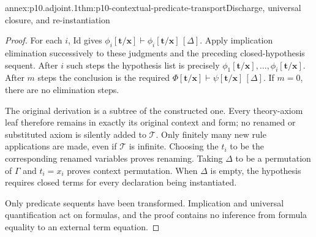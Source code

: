 \begin{annexitem}{annex:p10.adjoint.1}{thm:p10-contextual-predicate-transport}{Discharge, universal closure, and re-instantiation}
\begin{proof}
For each \(i\), Id gives
\(\phi_i[\mathbf t/\mathbf x]\vdash
  \phi_i[\mathbf t/\mathbf x]\,[\Delta]\).
Apply implication elimination successively to these judgments
and the preceding closed-hypothesis sequent. After \(i\) such
steps the hypothesis list is precisely
\(\phi_1[\mathbf t/\mathbf x],\ldots,
  \phi_i[\mathbf t/\mathbf x]\).
After \(m\) steps the conclusion is the required
\(\Phi[\mathbf t/\mathbf x]\vdash
  \psi[\mathbf t/\mathbf x]\,[\Delta]\).
If \(m=0\), there are no elimination steps.

The original derivation is a subtree of the constructed one.
Every theory-axiom leaf therefore remains in exactly its original
context and form; no renamed or substituted axiom is silently
added to \(\mathcal T\). Only finitely many new rule applications
are made, even if \(\mathcal T\) is infinite.
Choosing the \(t_i\) to be the corresponding renamed variables
proves renaming. Taking \(\Delta\) to be a permutation of
\(\Gamma\) and \(t_i=x_i\) proves context permutation.
When \(\Delta\) is empty, the hypothesis requires
closed terms for every declaration being instantiated.

Only predicate sequents have been transformed. Implication and
universal quantification act on formulas, and the proof contains
no inference from formula equality to an external term equation.
\end{proof}
\end{annexitem}

